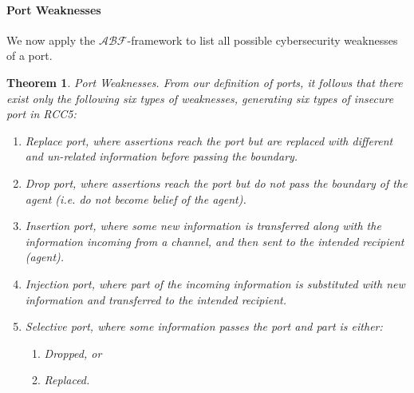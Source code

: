 \documentclass[conference]{IEEEtran}
\newcommand{\fixnote}[2]{\textbf{\color{red}{FIX}}\footnote{{\bf #1:} #2}}
\newcommand{\assertionRegion}{\mathcal{A}}
\newcommand{\beliefRegion}{\mathcal{B}}
\newcommand{\factRegion}{\mathcal{F}}
\newcommand{\abftheory}{\assertionRegion\beliefRegion\factRegion}
\newcommand{\rassert}[3]{\mathcal{A}_{#1\rightarrow #2}#3}
\newtheorem{definition}{Definition}%
\newtheorem{theorem}{Theorem}%
\begin{document}

\paragraph{Port Weaknesses} We now apply the $\abftheory$-framework to
list all possible cybersecurity weaknesses of a port.
\begin{theorem}{Port Weaknesses.}
From our definition of ports, it follows that there exist only the following \emph{six}
types of weaknesses, generating six types of insecure port in RCC5:
\begin{enumerate}[start=1, label={W\arabic*)}]
	\item \emph{Replace port}, where assertions reach
		the port but are replaced with different and un-related information
		before passing the boundary.
	\item \emph{Drop port}, where assertions reach the
		port but do not pass the boundary of the agent (i.e. do not
		become belief of the agent).
	\item \emph{Insertion port}, where some new information is transferred along with 
		the information incoming from a channel, and then sent to
		the intended recipient (agent).
	\item \emph{Injection port}, where part of the incoming information
		is substituted with new information and transferred to the intended recipient.
	\item \emph{Selective port}, where some information passes the port and
		part is either:
	\begin{enumerate}[start=1, label={W5.\arabic*)}]
		\item Dropped, or 
		\item Replaced.
	\end{enumerate}
\end{enumerate}
\end{theorem}
\end{document}
